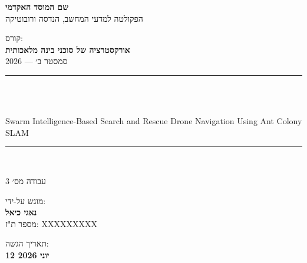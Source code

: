 \begin{titlepage}
    \centering
    \vspace*{1.5cm}

    {\large\textbf{שם המוסד האקדמי}}\\
    \vspace{0.3em}
    {\normalsize הפקולטה למדעי המחשב, הנדסה ורובוטיקה}\\
    \vspace{1.5cm}

    {\normalsize קורס:}\\
    \vspace{0.2em}
    {\large\textbf{אורקסטרציה של סוכני בינה מלאכותית}}\\
    \vspace{0.2em}
    {\normalsize סמסטר ב׳ --- 2026}\\
    \vspace{1.5cm}

    \rule{\linewidth}{1pt}\\
    \vspace{0.5cm}

    {\LARGE\bfseries {}}\\
    \vspace{0.4em}
    {\large\foreignlanguage{english}{Swarm Intelligence-Based Search and Rescue Drone Navigation Using Ant Colony SLAM}}\\
    \vspace{0.3em}

    \rule{\linewidth}{1pt}\\
    \vspace{1.5cm}

    {\large עבודה מס׳ 3}\\
    \vspace{2cm}

    {\normalsize מוגש על-ידי:}\\
    \vspace{0.5em}
    {\large\textbf{נאגי כיאל}}\\
    \vspace{0.2em}
    {\normalsize מספר ת"ז: XXXXXXXXX}\\
    \vspace{1cm}

    \vfill
    {\normalsize תאריך הגשה:}\\
    \vspace{0.2em}
    {\large\textbf{12 יוני 2026}}\\
    \vspace{1cm}
\end{titlepage}
